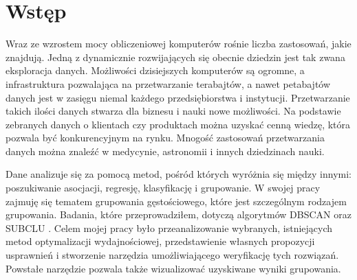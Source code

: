 \chapter{Wstęp}
Wraz ze wzrostem mocy obliczeniowej komputerów rośnie liczba zastosowań, jakie znajdują. Jedną z dynamicznie rozwijających się obecnie dziedzin jest tak zwana eksploracja danych. Możliwości dzisiejszych komputerów są ogromne, a infrastruktura pozwalająca na przetwarzanie terabajtów, a nawet petabajtów danych jest w zasięgu niemal każdego przedsiębiorstwa i instytucji. Przetwarzanie takich ilości danych stwarza dla biznesu i nauki nowe możliwości. Na podstawie zebranych danych o klientach czy produktach można uzyskać cenną wiedzę, która pozwala być konkurencyjnym na rynku. Mnogość zastosowań przetwarzania danych można znaleźć w medycynie, astronomii i innych dziedzinach nauki. \par
Dane analizuje się za pomocą metod, pośród których wyróżnia się między innymi: poszukiwanie asocjacji, regresję, klasyfikację i grupowanie. W swojej pracy zajmuję się tematem grupowania gęstościowego, które jest szczególnym rodzajem grupowania. Badania, które przeprowadziłem, dotyczą algorytmów DBSCAN \cite{dbscan} oraz SUBCLU \cite{subclu}. Celem mojej pracy było przeanalizowanie wybranych, istniejących metod optymalizacji wydajnościowej, przedstawienie własnych propozycji usprawnień i stworzenie narzędzia umożliwiającego weryfikację tych rozwiązań. Powstałe narzędzie pozwala także wizualizować uzyskiwane wyniki grupowania. \par